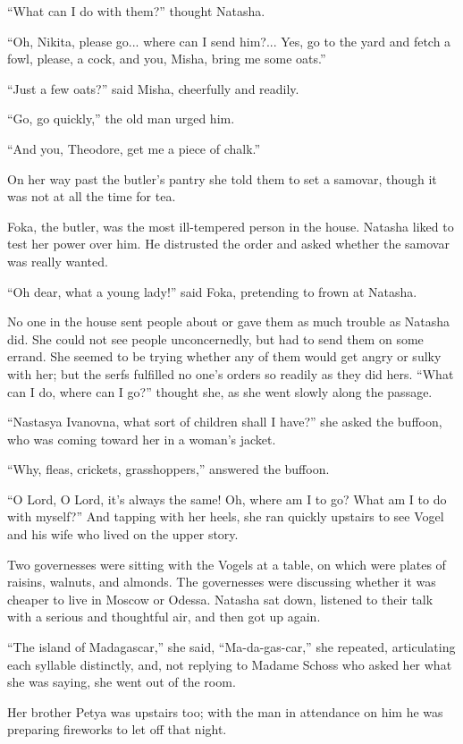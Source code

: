 ``What can I do with them?'' thought Natasha.

``Oh, Nikita, please go... where can I send him?... Yes, go to
the yard and fetch a fowl, please, a cock, and you, Misha, bring
me some oats.''

``Just a few oats?'' said Misha, cheerfully and readily.

``Go, go quickly,'' the old man urged him.

``And you, Theodore, get me a piece of chalk.''

On her way past the butler's pantry she told them to set a
samovar, though it was not at all the time for tea.

Foka, the butler, was the most ill-tempered person in the
house. Natasha liked to test her power over him. He distrusted
the order and asked whether the samovar was really wanted.

``Oh dear, what a young lady!'' said Foka, pretending to frown at
Natasha.

No one in the house sent people about or gave them as much
trouble as Natasha did. She could not see people unconcernedly,
but had to send them on some errand. She seemed to be trying
whether any of them would get angry or sulky with her; but the
serfs fulfilled no one's orders so readily as they did
hers. ``What can I do, where can I go?'' thought she, as she went
slowly along the passage.

``Nastasya Ivanovna, what sort of children shall I have?'' she
asked the buffoon, who was coming toward her in a woman's jacket.

``Why, fleas, crickets, grasshoppers,'' answered the buffoon.

``O Lord, O Lord, it's always the same! Oh, where am I to go?
What am I to do with myself?'' And tapping with her heels, she
ran quickly upstairs to see Vogel and his wife who lived on the
upper story.

Two governesses were sitting with the Vogels at a table, on which
were plates of raisins, walnuts, and almonds. The governesses
were discussing whether it was cheaper to live in Moscow or
Odessa. Natasha sat down, listened to their talk with a serious
and thoughtful air, and then got up again.

``The island of Madagascar,'' she said, ``Ma-da-gas-car,'' she
repeated, articulating each syllable distinctly, and, not
replying to Madame Schoss who asked her what she was saying, she
went out of the room.

Her brother Petya was upstairs too; with the man in attendance on
him he was preparing fireworks to let off that night.

